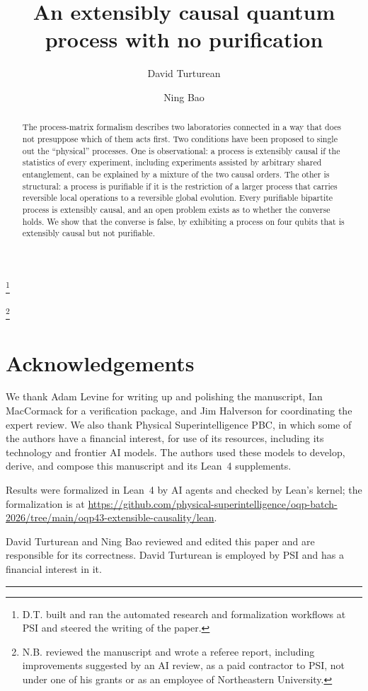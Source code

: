 \documentclass[aps,prl,reprint,superscriptaddress,nofootinbib,longbibliography,raggedbottom]{revtex4-2}
\begin{document}
\title{An extensibly causal quantum process with no purification}
\author{David Turturean}\thanks{D.T. built and ran the automated research and formalization workflows at PSI and steered the writing of the paper.}
\author{Ning Bao}\thanks{N.B. reviewed the manuscript and wrote a referee report, including improvements suggested by an AI review, as a paid contractor to PSI, not under one of his grants or as an employee of Northeastern University.}

\begin{abstract}
The process-matrix formalism describes two laboratories connected in a way
that does not presuppose which of them acts first. Two conditions have been
proposed to single out the ``physical'' processes. One is observational: a
process is extensibly causal if the statistics of every experiment, including
experiments assisted by arbitrary shared entanglement, can be explained by a
mixture of the two causal orders. The other is structural: a process is
purifiable if it is the restriction of a larger process that carries
reversible local operations to a reversible global evolution. Every
purifiable bipartite process is extensibly causal, and an open problem exists as to whether the converse holds. We show that the converse is false, by exhibiting
a process on four qubits that is extensibly causal
but not purifiable. 
\end{abstract}

\maketitle

{\raggedright\setlength{\parskip}{0.4\baselineskip}
\section*{Acknowledgements}

We thank Adam Levine for writing up and polishing the manuscript, Ian MacCormack for a verification package, and Jim Halverson for coordinating the expert review. We also thank Physical Superintelligence PBC, in which some of the authors have a financial interest, for use of its resources, including its technology and frontier AI models. The authors used these models to develop, derive, and compose this manuscript and its Lean~4 supplements.

Results were formalized in Lean~4 by AI agents and checked by Lean's kernel; the formalization is at \url{https://github.com/physical-superintelligence/oqp-batch-2026/tree/main/oqp43-extensible-causality/lean}.

David Turturean and Ning Bao reviewed and edited this paper and are responsible for its correctness. David Turturean is employed by PSI and has a financial interest in it.

\par}
\par\medskip\noindent\rule{\columnwidth}{0.4pt}\par\medskip
\end{document}

